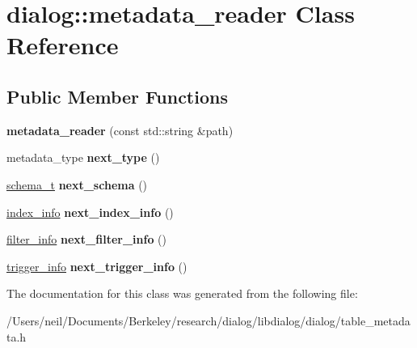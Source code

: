 \hypertarget{classdialog_1_1metadata__reader}{}\section{dialog\+:\+:metadata\+\_\+reader Class Reference}
\label{classdialog_1_1metadata__reader}
\subsection*{Public Member Functions}
\begin{DoxyCompactItemize}
\item 
\mbox{\label{classdialog_1_1metadata__reader_a1c24163850b7540c5381396d1d06d485}} 
{\bfseries metadata\+\_\+reader} (const std\+::string \&path)
\item 
\mbox{\label{classdialog_1_1metadata__reader_aaf29d7875368ca3b5d7e13d3609e858b}} 
metadata\+\_\+type {\bfseries next\+\_\+type} ()
\item 
\mbox{\label{classdialog_1_1metadata__reader_a6f30d4bbfb267e091ad6f2a54327e4b1}} 
\hyperlink{classdialog_1_1schema__t}{schema\+\_\+t} {\bfseries next\+\_\+schema} ()
\item 
\mbox{\label{classdialog_1_1metadata__reader_a8df956689df5101f445e074de62f7f0b}} 
\hyperlink{structdialog_1_1index__info}{index\+\_\+info} {\bfseries next\+\_\+index\+\_\+info} ()
\item 
\mbox{\label{classdialog_1_1metadata__reader_a9e0eb82c6918326dce0d7f58be48eb45}} 
\hyperlink{structdialog_1_1filter__info}{filter\+\_\+info} {\bfseries next\+\_\+filter\+\_\+info} ()
\item 
\mbox{\label{classdialog_1_1metadata__reader_ae2d0c17b8876e1286d16a6d01d22fc99}} 
\hyperlink{structdialog_1_1trigger__info}{trigger\+\_\+info} {\bfseries next\+\_\+trigger\+\_\+info} ()
\end{DoxyCompactItemize}


The documentation for this class was generated from the following file\+:\begin{DoxyCompactItemize}
\item 
/\+Users/neil/\+Documents/\+Berkeley/research/dialog/libdialog/dialog/table\+\_\+metadata.\+h\end{DoxyCompactItemize}
